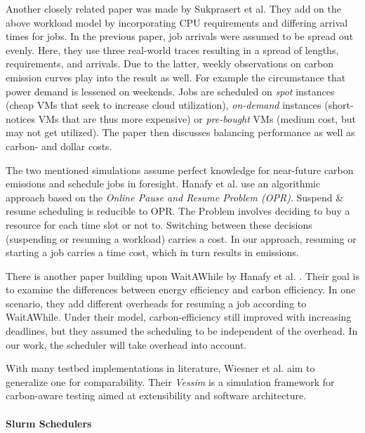 Another closely related paper was made by Sukprasert et al. \cite{sukprasert_limitations_2024}
They add on the above workload model by incorporating CPU requirements and differing arrival times for jobs. In the previous paper, job arrivals were assumed to be spread out evenly. Here, they use three real-world traces resulting in a spread of lengths, requirements, and arrivals. 
Due to the latter, weekly observations on carbon emission curves play into the result as well. For example the circumstance that power demand is lessened on weekends.
Jobs are scheduled on \emph{spot} instances (cheap VMs that seek to increase cloud utilization), \emph{on-demand} instances (short-notices VMs that are thus more expensive) or \emph{pre-bought} VMs (medium cost, but may not get utilized).
The paper then discusses balancing performance as well as carbon- and dollar costs. 

The two mentioned simulations assume perfect knowledge for near-future carbon emissions and schedule jobs in foresight. Hanafy et al. \cite{lechowicz_online_2023} use an algorithmic approach based on the \emph{Online Pause and Resume Problem (OPR)}. 
Suspend \& resume scheduling is reducible to OPR. The Problem involves deciding to buy a resource for each time slot or not to. 
Switching between these decisions (suspending or resuming a workload) carries a cost. In our approach, resuming or starting a job carries a time cost, which in turn results in emissions.

There is another paper building upon WaitAWhile by Hanafy et al. \cite{hanafy_war_2023}. Their goal is to examine the differences between energy efficiency and carbon efficiency. In one scenario, they add different overheads for resuming a job according to WaitAWhile. 
Under their model, carbon-efficiency still improved with increasing deadlines, but they assumed the scheduling to be independent of the overhead.
In our work, the scheduler will take overhead into account.

With many testbed implementations in literature, Wiesner et al. \cite{wiesner_vessim_2024} aim to generalize one for comparability. Their \emph{Vessim} is a simulation framework for carbon-aware testing aimed at extensibility and software architecture.

\paragraph{Slurm Schedulers}

